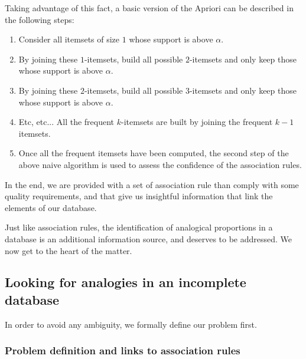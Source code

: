 Taking advantage of this fact, a basic version of the Apriori can be described
in the following steps:
\begin{enumerate}
  \item Consider all itemsets of size $1$ whose support is above $\alpha$.
  \item By joining these $1$-itemsets, build all possible $2$-itemsets and only
    keep those whose support is above $\alpha$.
  \item By joining these $2$-itemsets, build all possible $3$-itemsets and only
    keep those whose support is above $\alpha$.
  \item Etc, etc... All the frequent $k$-itemsets are built by joining the
    frequent $k-1$ itemsets.
  \item Once all the frequent itemsets have been computed, the second step of
    the above naive algorithm is used to assess the confidence of the
    association rules.
\end{enumerate}

In the end, we are provided with a set of association rule than comply with
some quality requirements, and that give us insightful information that link
the elements of our database.


Just like association rules, the identification of analogical proportions in a
database is an additional information source, and deserves to be addressed. We
now get to the heart of the matter.

\subsection{Looking for analogies in an incomplete database}

In order to avoid any ambiguity, we formally define our problem first.
\subsubsection{Problem definition and links to association rules}

